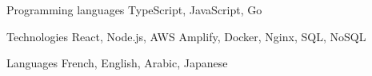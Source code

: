 

\begin{cvskills}

  \cvskill
    {Programming languages} %
    {TypeScript, JavaScript, Go} %

  \cvskill
    {Technologies} %
    {React, Node.js, AWS Amplify, Docker, Nginx, SQL, NoSQL}  %

  \cvskill
    {Languages} %
    {French, English, Arabic, Japanese} %

\end{cvskills}
